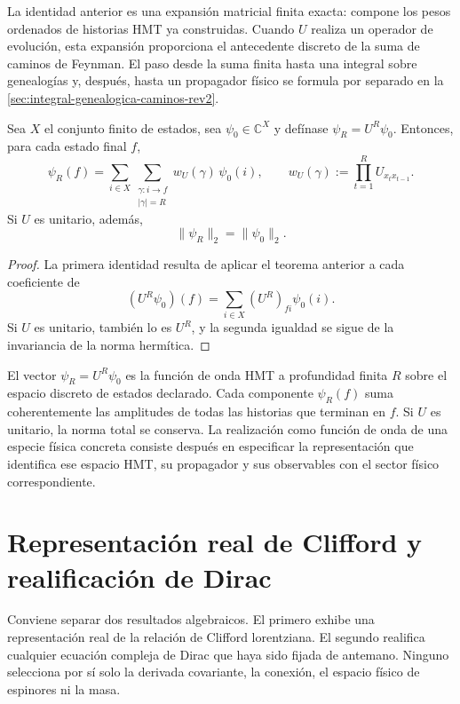La identidad anterior es una expansión matricial finita exacta: compone los
pesos ordenados de historias HMT ya construidas. Cuando \(U\) realiza un
operador de evolución, esta expansión proporciona el antecedente discreto de
la suma de caminos de Feynman. El paso desde la suma finita hasta una integral
sobre genealogías y, después, hasta un propagador físico se formula por
separado en la \cref{sec:integral-genealogica-caminos-rev2}.

\begin{corollary}
\label{cor:amplitud-global-banda-finita}
Sea \(X\) el conjunto finito de estados, sea
\(\psi_0\in\mathbb C^X\) y defínase \(\psi_R=U^R\psi_0\). Entonces, para
cada estado final \(f\),
\[
 \psi_R(f)
 =\sum_{i\in X}
   \sum_{\substack{\gamma:i\to f\\|\gamma|=R}}
   w_U(\gamma)\,\psi_0(i),
 \qquad
 w_U(\gamma):=
 \prod_{t=1}^{R}U_{x_t x_{t-1}}.
\]
Si \(U\) es unitario, además,
\[
 \|\psi_R\|_2=\|\psi_0\|_2.
\]
\end{corollary}

\begin{proof}
La primera identidad resulta de aplicar el teorema anterior a cada
coeficiente de
\[
 (U^R\psi_0)(f)=\sum_{i\in X}(U^R)_{fi}\psi_0(i).
\]
Si \(U\) es unitario, también lo es \(U^R\), y la segunda igualdad se sigue
de la invariancia de la norma hermítica.
\end{proof}

El vector \(\psi_R=U^R\psi_0\) es la función de onda HMT a profundidad finita
\(R\) sobre el espacio discreto de estados declarado. Cada componente
\(\psi_R(f)\) suma coherentemente las amplitudes de todas las historias que
terminan en \(f\). Si \(U\) es unitario, la norma total se conserva. La
realización como función de onda de una especie física concreta consiste
después en especificar la representación que identifica ese espacio HMT, su
propagador y sus observables con el sector físico correspondiente.

\section{Representación real de Clifford y realificación de Dirac}
\label{sec:dirac-real-hmt-md}

Conviene separar dos resultados algebraicos. El primero exhibe una
representación real de la relación de Clifford lorentziana. El segundo
realifica cualquier ecuación compleja de Dirac que haya sido fijada de
antemano. Ninguno selecciona por sí solo la derivada covariante, la conexión,
el espacio físico de espinores ni la masa.


